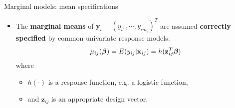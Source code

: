 \documentclass{beamer}
\begin{document}
%
%
%


\begin{frame}{\large   Marginal models: mean specifications}


\begin{itemize}


\item
The \textbf{marginal means} of $\textbf{y}_i=(y_{i1},\cdots, y_{im_i})^T$ are assumed \textbf{correctly specified} by
common univariate response models:
\begin{equation}
\mu_{ij}(\mbox{\boldmath $\beta$})=E(y_{ij} | \textbf{x}_{ij})=h(\textbf{z}_{ij}^T\mbox{\boldmath $\beta$})
\label{eq-3.5.7}
\end{equation}
where 
\begin{itemize}
\item $h(\cdot)$ is a response function, e.g. a logistic function, 
\item and $\textbf{z}_{ij}$ is an 
appropriate design vector.
\end{itemize}

\end{itemize}
\end{frame}
\end{document}
